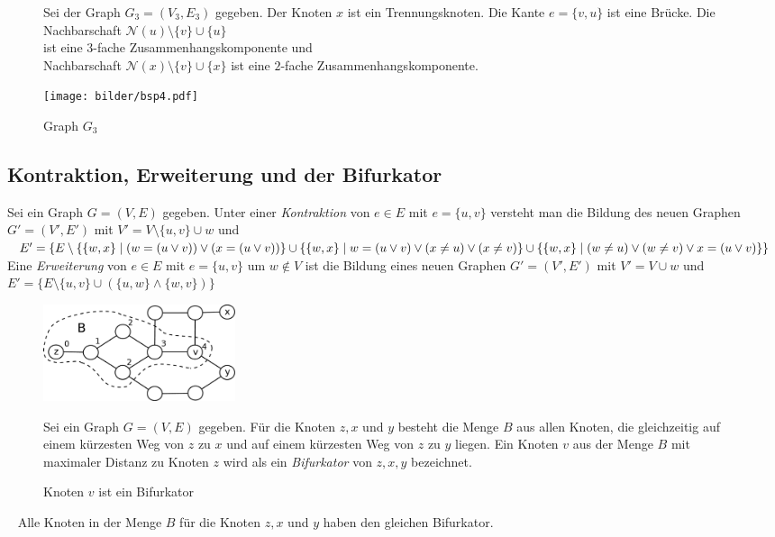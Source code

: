 \begin{figure}[h!]
\begin{minipage}{260pt}
Sei der Graph $G_3=(V_3,E_3)$ gegeben. Der Knoten $x$ ist ein Trennungsknoten. Die Kante $e=\{v,u\}$ ist eine Brücke. Die Nachbarschaft $\mathcal{N}(u)\setminus \{v\}\cup\{u\}$\\ist eine $3$-fache Zusammenhangskomponente und\\Nachbarschaft $\mathcal{N}(x)\setminus \{v\}\cup\{x\}$ ist eine $2$-fache Zusammenhangskomponente.
\end{minipage}
\begin{minipage}{160pt}
		\centering 		 
   \texttt{[image: bilder/bsp4.pdf]}
	\caption{Graph $G_3$}
\end{minipage}
  	 \end{figure}
  	\newpage
\subsection{Kontraktion, Erweiterung und der Bifurkator}
Sei ein Graph $G=(V,E)$ gegeben. Unter einer \emph{Kontraktion} von $e \in E$ mit $e=\{u,v\}$ versteht man die Bildung des neuen Graphen $G'=(V',E')$ mit $V'=V \setminus{\{u,v\}} \cup w$ und $E'=\{E\setminus\{\{w,x\}\;|\;(w=(u \vee v)) \vee (x=(u\vee v))\} \cup\\ \{\{w,x\}\;|\;w=(u \vee v) \vee (x\neq u)\vee(x \neq v)\} \cup \{\{w,x\}\;|\;(w\neq u) \vee (w \neq v) \vee x=(u\vee v)\} \}$\newline\newline
Eine \emph{Erweiterung} von $e \in E$ mit $e=\{u,v\}$ um $w \notin V$ ist die Bildung eines neuen Graphen $G'=(V',E')$ mit $V'=V \cup w$ und $E'=\{E \setminus \{u,v\} \cup (\{u,w\} \wedge \{w,v\})\}$\newline
\vspace{-4mm}
\begin{figure}[ht]
\begin{minipage}{210pt}
\centering
\includegraphics*[width = 160pt]{bilder/bifurkator.pdf}
\caption{Knoten $v$ ist ein Bifurkator}
\label{bild:bifurkator}
\end{minipage}
\begin{minipage}{210pt}
Sei ein Graph $G=(V,E)$ gegeben. Für die Knoten $z,x$ und $y$ besteht die Menge $B$ aus allen Knoten, die gleichzeitig auf einem kürzesten Weg von $z$ zu $x$ und auf einem kürzesten Weg von $z$ zu $y$ liegen. Ein Knoten $v$ aus der Menge $B$ mit maximaler Distanz zu Knoten $z$ wird als ein \emph{Bifurkator} von $z, x, y$ bezeichnet.
\end{minipage}
\end{figure}
\vspace{-2mm}  	
~\linebreak
Alle Knoten in der Menge $B$ für die Knoten $z,x$ und $y$ haben den gleichen Bifurkator.
\vspace{-3mm}
